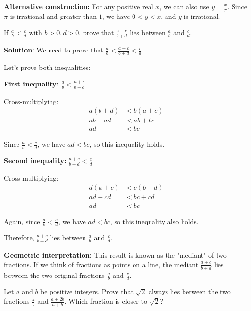 \textbf{Alternative construction:}
For any positive real $x$, we can also use $y = \frac{x}{\pi}$. Since $\pi$ is irrational and greater than $1$, we have $0 < y < x$, and $y$ is irrational.

\begin{problembox}
If $\frac{a}{b} < \frac{c}{d}$ with $b > 0, d > 0$, prove that $\frac{a + c}{b + d}$ lies between $\frac{a}{b}$ and $\frac{c}{d}$.
\end{problembox}

\textbf{Solution:}
We need to prove that $\frac{a}{b} < \frac{a + c}{b + d} < \frac{c}{d}$.

Let's prove both inequalities:

\textbf{First inequality:} $\frac{a}{b} < \frac{a + c}{b + d}$

Cross-multiplying:
\begin{align*}
a(b + d) &< b(a + c) \\
ab + ad &< ab + bc \\
ad &< bc
\end{align*}

Since $\frac{a}{b} < \frac{c}{d}$, we have $ad < bc$, so this inequality holds.

\textbf{Second inequality:} $\frac{a + c}{b + d} < \frac{c}{d}$

Cross-multiplying:
\begin{align*}
d(a + c) &< c(b + d) \\
ad + cd &< bc + cd \\
ad &< bc
\end{align*}

Again, since $\frac{a}{b} < \frac{c}{d}$, we have $ad < bc$, so this inequality also holds.

Therefore, $\frac{a + c}{b + d}$ lies between $\frac{a}{b}$ and $\frac{c}{d}$.

\textbf{Geometric interpretation:}
This result is known as the "mediant" of two fractions. If we think of fractions as points on a line, the mediant $\frac{a + c}{b + d}$ lies between the two original fractions $\frac{a}{b}$ and $\frac{c}{d}$.

\begin{problembox}
Let $a$ and $b$ be positive integers. Prove that $\sqrt{2}$ always lies between the two fractions $\frac{a}{b}$ and $\frac{a + 2b}{a + b}$. Which fraction is closer to $\sqrt{2}$?
\end{problembox}

